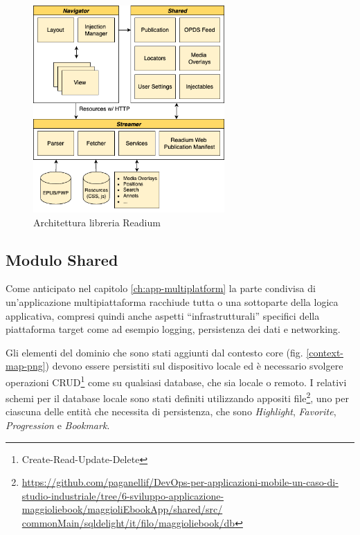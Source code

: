 \begin{figure}[H]
    \centering
    \includegraphics[width=0.65\textwidth]{img/readium-arch.png}
    \caption{Architettura libreria Readium}
    \label{readiumarch}
\end{figure}

\subsection{Modulo Shared}
Come anticipato nel capitolo \ref{ch:app-multiplatform} la parte condivisa di un'applicazione multipiattaforma racchiude tutta o una sottoparte della logica applicativa, 
compresi quindi anche aspetti ``infrastrutturali'' specifici della piattaforma target come ad esempio logging, persistenza dei dati e networking.

Gli elementi del dominio che sono stati aggiunti dal contesto core (fig. \ref{context-map-png}) devono essere persistiti sul dispositivo locale ed è necessario svolgere operazioni CRUD\footnote{Create-Read-Update-Delete} come su qualsiasi database, 
che sia locale o remoto. 
I relativi schemi per il database locale sono stati definiti utilizzando appositi file\footnote{\href{https://github.com/paganellif/DevOps-per-applicazioni-mobile-un-caso-di-studio-industriale/tree/6-sviluppo-applicazione-maggioliebook/maggioliEbookApp/shared/src/commonMain/sqldelight/it/filo/maggioliebook/db}{https://github.com/paganellif/DevOps-per-applicazioni-mobile-un-caso-di-studio-industriale/tree/6-sviluppo-applicazione-maggioliebook/maggioliEbookApp/shared/src/\\commonMain/sqldelight/it/filo/maggioliebook/db}}, 
uno per ciascuna delle entità che necessita di persistenza, 
che sono \textit{Highlight}, 
\textit{Favorite}, 
\textit{Progression} e \textit{Bookmark}.


